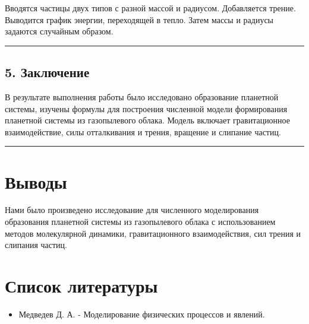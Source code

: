 \documentclass[
  english,
  russian,
  12pt,
  a4paper,
  DIV=11,
  numbers=noendperiod]{scrreprt}
\providecommand{\tightlist}{%
  \setlength{\itemsep}{0pt}\setlength{\parskip}{0pt}}
\begin{document}
Вводятся частицы двух типов с разной массой и радиусом. Добавляется
трение. Выводится график энергии, переходящей в тепло. Затем массы и
радиусы задаются случайным образом.

\begin{center}\rule{0.5\linewidth}{0.5pt}\end{center}

\section{5.
Заключение}\label{ux437ux430ux43aux43bux44eux447ux435ux43dux438ux435}

В результате выполнения работы было исследовано образование планетной
системы, изучены формулы для построения численной модели формирования
планетной системы из газопылевого облака. Модель включает гравитационное
взаимодействие, силы отталкивания и трения, вращение и слипание частиц.

\begin{center}\rule{0.5\linewidth}{0.5pt}\end{center}

\chapter{Выводы}\label{ux432ux44bux432ux43eux434ux44b}

Нами было произведено исследование для численного моделирования
образования планетной системы из газопылевого облака с использованием
методов молекулярной динамики, гравитационного взаимодействия, сил
трения и слипания частиц.

\chapter*{Список
литературы}\label{ux441ux43fux438ux441ux43eux43a-ux43bux438ux442ux435ux440ux430ux442ux443ux440ux44b}

\begin{itemize}
\tightlist
\item
  Медведев Д. А. - Моделирование физических процессов и явлений.
\end{itemize}

\printbibliography[heading=none]
\end{document}

